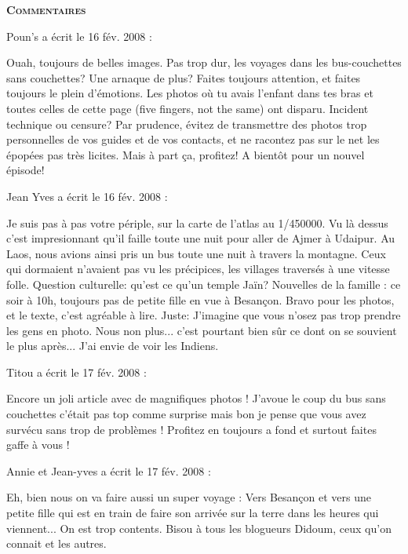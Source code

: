 \bigskip
\textbf{\textsc{Commentaires}}

\medskip
Poun's a écrit le 16 fév. 2008 :
\begin{displayquote}
Ouah, toujours de belles images. Pas trop dur, les voyages dans les bus-couchettes sans couchettes?
Une arnaque de plus? Faites toujours attention, et faites toujours le plein d'émotions.
Les photos où tu avais l'enfant dans tes bras et toutes celles de cette page (five fingers, not the same) ont disparu. Incident technique ou censure?
Par prudence, évitez de transmettre des photos trop personnelles de vos guides et de vos contacts, et ne racontez pas sur le net les épopées pas très licites.
Mais à part ça, profitez!
A bientôt pour un nouvel épisode!
\end{displayquote}

\medskip
Jean Yves a écrit le 16 fév. 2008 :
\begin{displayquote}
Je suis pas à pas votre périple, sur la carte de l'atlas au 1/450000. Vu là dessus c'est impresionnant qu'il faille toute une nuit pour aller de Ajmer à Udaipur. Au Laos, nous avions ainsi pris un bus toute une nuit à travers la montagne. Ceux qui dormaient n'avaient pas vu les précipices, les villages traversés à une vitesse folle.
Question culturelle: qu'est ce qu'un temple Jaïn?
Nouvelles de la famille : ce soir à 10h, toujours pas de petite fille en vue à Besançon.
Bravo pour les photos, et le texte, c'est agréable à lire.
Juste: J'imagine que vous n'osez pas trop prendre les gens en photo. Nous non plus... c'est pourtant bien sûr ce dont on se souvient le plus après... J'ai envie de voir les Indiens.
\end{displayquote}

\medskip
Titou a écrit le 17 fév. 2008 :
\begin{displayquote}
Encore un joli article avec de magnifiques photos ! J'avoue le coup du bus sans couchettes c'était pas top comme surprise mais bon je pense que vous avez survécu sans trop de problèmes ! Profitez en toujours a fond et surtout faites gaffe à vous !
\end{displayquote}

\medskip
Annie et Jean-yves a écrit le 17 fév. 2008 :
\begin{displayquote}
Eh, bien nous on va faire aussi un super voyage :
Vers Besançon et vers une petite fille qui est en train de faire son arrivée sur la terre dans les heures qui viennent... On est trop contents. Bisou à tous les blogueurs Didoum, ceux qu'on connait et les autres.
\end{displayquote}

